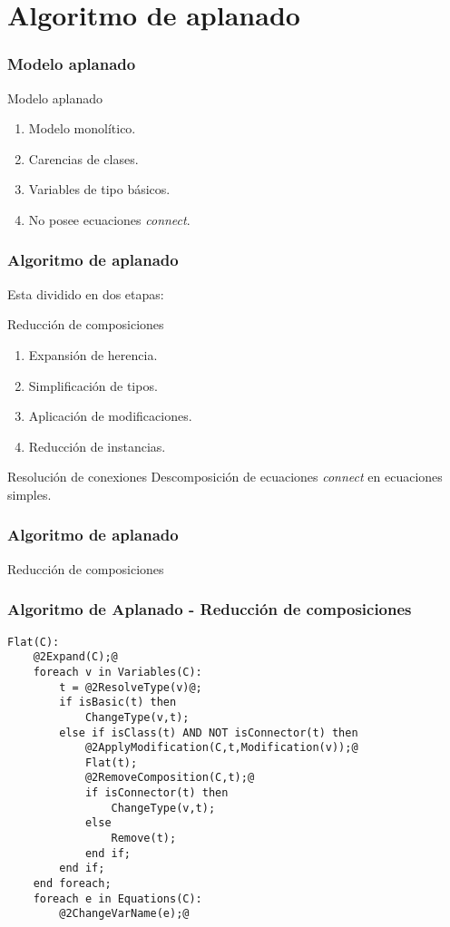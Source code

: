 \section{Algoritmo de aplanado}

\begin{frame}[fragile]
\frametitle{Modelo aplanado} 
\begin{block}{Modelo aplanado}
\begin{enumerate}
\item Modelo monolítico.
\item Carencias de clases.
\item Variables de tipo básicos.
\item No posee ecuaciones \textit{connect}.
\end{enumerate}
\end{block}
\end{frame}


\begin{frame}[fragile]
\frametitle{Algoritmo de aplanado} 
Esta dividido en dos etapas:
\begin{block}{Reducción de composiciones}
\begin{enumerate}
\item Expansión de herencia.
\item Simplificación de tipos.
\item Aplicación de modificaciones.
\item Reducción de instancias. 
\end{enumerate}
\end{block}

\begin{block}{Resolución de conexiones}
Descomposición de ecuaciones \textit{connect} en ecuaciones simples.
\end{block}
\end{frame}

\begin{frame}[fragile]
\frametitle{Algoritmo de aplanado} 
\begin{center}
\huge Reducción de composiciones
\end{center}
\end{frame}

\begin{frame}[fragile]
\frametitle{Algoritmo de Aplanado - Reducción de composiciones} 
\begin{lstlisting}[style=base,basicstyle=\scriptsize]
Flat(C):
    @2Expand(C);@
    foreach v in Variables(C):
        t = @2ResolveType(v)@;
        if isBasic(t) then 
            ChangeType(v,t);
        else if isClass(t) AND NOT isConnector(t) then
            @2ApplyModification(C,t,Modification(v));@
            Flat(t);
            @2RemoveComposition(C,t);@  
            if isConnector(t) then
                ChangeType(v,t);
            else
                Remove(t);
            end if;     
        end if;     
    end foreach;    
    foreach e in Equations(C):  
        @2ChangeVarName(e);@     
\end{lstlisting}
\end{frame}

